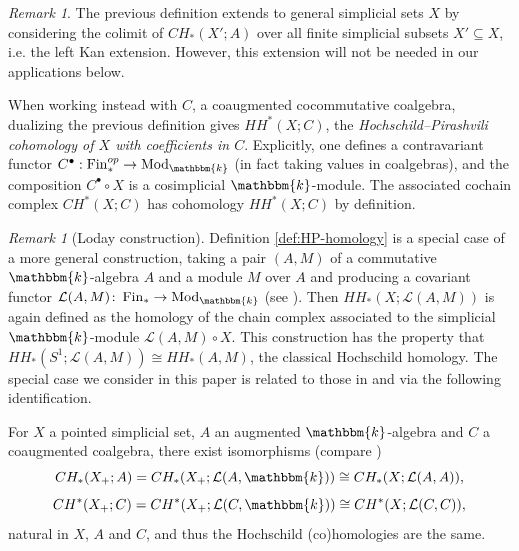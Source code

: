 \documentclass[12pt]{article}
\newcommand{\kk}{\mathbbm{k}}
\newcommand{\Loday}[2]{\mathcal{L}({#1},{#2})}
\DeclareMathOperator{\Fin}{Fin}
\theoremstyle{plain}
\theoremstyle{definition}
\theoremstyle{remark}
\newtheorem{rmk}[thm]{Remark}
\begin{document}
\begin{rmk}\label{rmk:Kan-extension-A-bullet}
    The previous definition extends to general simplicial sets $X$ by considering the colimit of $CH_{\ast}(X';A)$ over all finite simplicial subsets $X' \subseteq X$, i.e. the left Kan extension. However, this extension will not be needed in our applications below.
\end{rmk}

When working instead with $C$, a coaugmented cocommutative coalgebra, dualizing the previous definition gives $HH^{\ast}(X; C)$, the \emph{Hochschild--Pirashvili cohomology of $X$ with coefficients in $C$}. Explicitly, one defines a contravariant functor $C^\bullet:\Fin_*^{op} \to \operatorname{Mod}_{\kk}$ (in fact taking values in coalgebras), and the composition $C^\bullet \circ X$ is a cosimplicial $\kk$-module. The associated cochain complex $CH^*(X;C)$ has cohomology $HH^{\ast}(X; C)$ by definition.

\begin{rmk}[Loday construction]
    Definition \ref{def:HP-homology} is a special case of a more general construction, taking a pair $(A, M)$ of a commutative $\kk$-algebra $A$ and a module $M$ over $A$ and producing a covariant functor $\Loday{A}{M}\colon \Fin_*\to \operatorname{Mod}_{\kk}$ (see \cite[\S 1.7]{Pir00}). Then $HH_{\ast}(X; \Loday{A}{M})$ is again defined as the homology of the chain complex associated to the simplicial $\kk$-module $\Loday{A}{M}\circ X$. This construction has the property that $HH_{\ast}(S^1; \Loday{A}{M})\cong HH_{\ast}(A, M)$, the classical Hochschild homology. The special case we consider in this paper is related to those in \cite{TW19} and \cite{PV18} via the following identification.%
    



    For $X$ a pointed simplicial set, $A$ an augmented $\kk$-algebra and $C$ a coaugmented coalgebra, there exist isomorphisms (compare \cite[Lemma 13.11]{PV18})
    \begin{equation}
        CH_{\ast}(X_+; A) = CH_{\ast}(X_+; \Loday{A}{\kk}) \cong CH_{\ast}(X; \Loday{A}{A}),
    \end{equation}
    \begin{equation}
        CH^{\ast}(X_+; C) = CH^{\ast}(X_+; \Loday{C}{\kk}) \cong CH^{\ast}(X; \Loday{C}{C}),
    \end{equation}
    natural in $X$, $A$ and $C$, and thus the Hochschild (co)homologies are the same.
\end{rmk}
\end{document}
